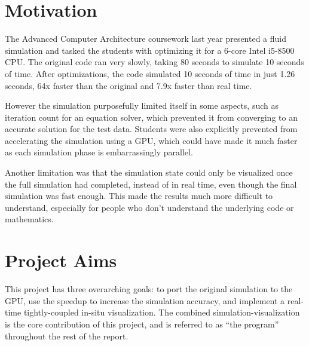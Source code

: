 \section{Motivation}
The Advanced Computer Architecture coursework last year presented a fluid simulation and tasked the students with optimizing it for a 6-core Intel i5-8500 CPU\cite{modules:CS257Coursework}.
The original code ran very slowly, taking 80 seconds to simulate 10 seconds of time. %
After optimizations, the code simulated 10 seconds of time in just 1.26 seconds, 64x faster than the original and 7.9x faster than real time.\cite{modules:aca257submission}

However the simulation purposefully limited itself in some aspects, such as iteration count for an equation solver, which prevented it from converging to an accurate solution for the test data.
Students were also explicitly prevented from accelerating the simulation using a GPU, which could have made it much faster as each simulation phase is embarrassingly parallel.

Another limitation was that the simulation state could only be visualized once the full simulation had completed,
instead of in real time, even though the final simulation was fast enough.
This made the results much more difficult to understand, especially for people who don't understand the underlying code or mathematics.

\section{Project Aims}
This project has three overarching goals: to port the original simulation to the GPU, use the speedup to increase the simulation accuracy, and implement a real-time tightly-coupled in-situ visualization.
The combined simulation-visualization is the core contribution of this project, and is referred to as ``the program'' throughout the rest of the report.

